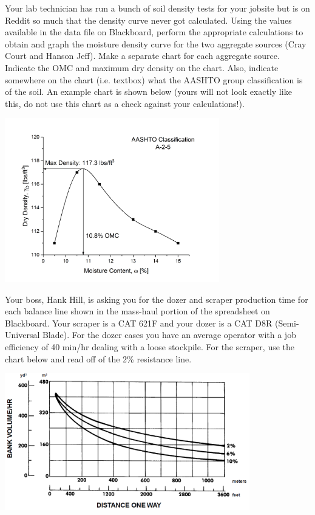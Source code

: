 \documentclass[addpoints,12pt,answers]{exam}
\begin{document}
\newpage
\begin{questions}
\question[8] Your lab technician has run a bunch of soil density tests for your jobsite but is on Reddit so much that the density curve never got calculated. Using the values available in the data file on Blackboard, perform the appropriate calculations to obtain and graph the moisture density curve for the two aggregate sources (Cray Court and Hanson Jeff). Make a separate chart for each aggregate source. Indicate the OMC and maximum dry density on the chart. Also, indicate somewhere on the chart (i.e. textbox) what the AASHTO group classification is of the soil. An example chart is shown below (yours will not look exactly like this, do not use this chart as a check against your calculations!). 
\begin{center}
\includegraphics[width=0.7\textwidth]{exampleProctor.png}
\end{center}
\newpage
\question[10] Your boss, Hank Hill, is asking you for the dozer and scraper production time for each balance line shown in the mass-haul portion of the spreadsheet on Blackboard. Your scraper is a CAT 621F and your dozer is a CAT D8R (Semi-Universal Blade). For the dozer cases you have an average operator with a job efficiency of 40 min/hr dealing with a loose stockpile. For the scraper, use the chart below and read off of the 2\% resistance line.
\begin{center}
\includegraphics[width=0.8\textwidth]{scraper.png}\\

\end{center}
\end{questions}
\end{document}
